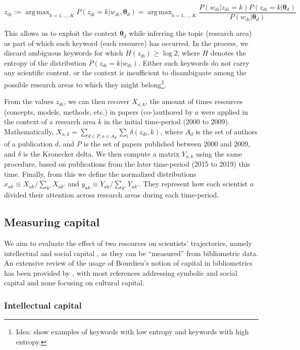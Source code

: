 \documentclass{article}
\DeclareMathOperator*{\argmax}{arg\,max}
\begin{document}
\begin{equation}
    z_{di} := \argmax_{k=1,\dots,K} P(z_{di}=k|w_{di},\bm{\theta}_{d}) =  \argmax_{k=1,\dots,K} \dfrac{P(w_{di}|z_{di}=k)P(z_{di}=k|\bm{\theta}_d)}{P(w_{di}|\bm{\theta}_d)}
\end{equation}

This allows us to exploit the context $\bm{\theta}_d$ while inferring the topic (research area) as part of which each keyword (each resource) has occurred. In the process, we discard ambiguous keywords for which $H(z_{di})\geq \log{2}$, where $H$ denotes the entropy of the distribution $P(z_{di}=k|w_{di})$. Either such keywords do not carry any scientific content, or the context is insufficient to disambiguate among the possible research areas to which they might belong\footnote{Idea: show examples of keywords with low entropy and keywords with high entropy.}.

From the values $z_{di}$, we can then recover $X_{a,k}$, the amount of times resources (concepts, models, methods, etc.) in papers (co-)authored by $a$ were applied in the context of a research area $k$ in the initial time-period (2000 to 2009). Mathematically, $X_{a,k}=\sum_{d\in P,a\in A_d} \sum_i \delta(z_{di},k)$, where $A_d$ is the set of authors of a publication $d$, and $P$ is the set of papers published between 2000 and 2009, and $\delta$ is the Kronecker delta. We then compute a matrix $Y_{a,k}$ using the same procedure, based on publications from the later time-period (2015 to 2019) this time. Finally, from this we define the normalized distributions $x_{ak} \equiv X_{ak}/\sum_{k'} X_{ak'}$ and $y_{ak} \equiv Y_{ak}/\sum_{k'} Y_{ak'}$. They represent how each scientist $a$ divided their attention across research areas during each time-period.

\subsection{\label{sec:capital}Measuring capital}

We aim to evaluate the effect of two resources on scientists' trajectories, namely intellectual and social capital \citep{Bourdieu1986}, as they can be ``measured'' from bibliometric data. An extensive review of the usage of Bourdieu's notion of capital in bibliometrics has been provided by \citet[p.~198-200]{Schirone2023}, with most references addressing symbolic and social capital and none focusing on cultural capital. 

\subsubsection{Intellectual capital}
\end{document}
